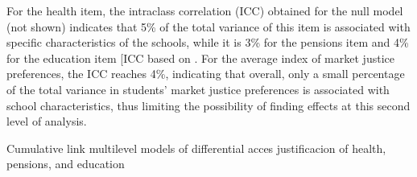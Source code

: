 \documentclass[
  12pt,
  letterpaper,
]{article}
\begin{document}
For the health item, the intraclass correlation (ICC) obtained for the
null model (not shown) indicates that 5\% of the total variance of this
item is associated with specific characteristics of the schools, while
it is 3\% for the pensions item and 4\% for the education item {[}ICC
based on \citeproc{ref-hox_multilevel_2010}{75}{]}. For the average
index of market justice preferences, the ICC reaches 4\%, indicating
that overall, only a small percentage of the total variance in students'
market justice preferences is associated with school characteristics,
thus limiting the possibility of finding effects at this second level of
analysis.

\begin{table}

\caption{\label{tbl-ordinal-reg}Cumulative link multilevel models of
differential acces justificacion of health, pensions, and education}

\centering{

}
\end{table}
\end{document}
